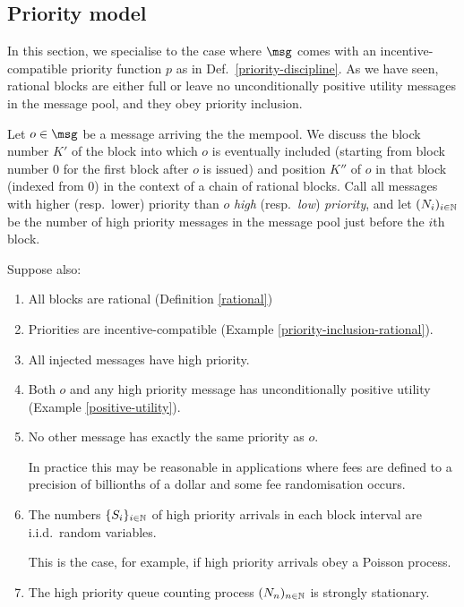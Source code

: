 \documentclass[a4paper,11pt]{article}
\begin{document}
\subsection{Priority model}
\label{priority-model}

In this section, we specialise to the case where $\msg$ comes with an incentive-compatible priority function $p$ as in Def.~\ref{priority-discipline}.
%
As we have seen, rational blocks are either full or leave no unconditionally positive utility messages in the message pool, and they obey priority inclusion.

Let $o\in\msg$ be a message arriving the the mempool. We discuss the block number $K'$ of the block into which $o$ is eventually included (starting from block number $0$ for the first block after $o$ is issued) and position $K''$ of $o$ in that block (indexed from $0$) in the context of a chain of rational blocks.
%
Call all messages with higher (resp.~lower) priority than $o$ \emph{high} (resp.~\emph{low}) \emph{priority}, and let $(N_{i})_{i\in\mathbb N}$ be the number of high priority messages in the message pool just before the $i$th block.




Suppose also:
\begin{enumerate}
  \item 
    All blocks are rational (Definition \ref{rational})
    
  \item
    Priorities are incentive-compatible (Example \ref{priority-inclusion-rational}).
    
  \item 
    All injected messages have high priority.
    
  \item 
    Both $o$ and any high priority message has unconditionally positive utility (Example \ref{positive-utility}).
    
  \item 
    No other message has exactly the same priority as $o$.
    
    In practice this may be reasonable in applications where fees are defined to a precision of billionths of a dollar and some fee randomisation occurs.
    
  \item
    The numbers $\{S_i\}_{i\in\mathbb N}$ of high priority arrivals in each block interval are i.i.d.~random variables. 
     
    This is the case, for example, if high priority arrivals obey a Poisson process.
    
  \item
    The high priority queue counting process $(N_{n})_{n\in\mathbb N}$ is strongly stationary.
    
\end{enumerate}
\end{document}

